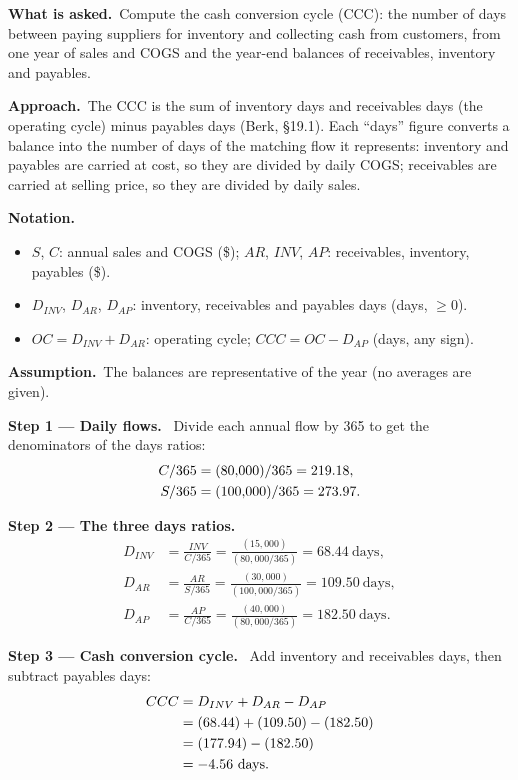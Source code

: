 \documentclass[11pt,a4paper]{article}
\newcommand{\notation}{\par\noindent\textbf{Notation.}}
\newcommand{\step}[2]{\par\medskip\noindent\textbf{Step #1 --- #2.}~}
\newcommand{\assume}{\par\smallskip\noindent\textbf{Assumption.}~}
\newcommand{\asked}{\par\medskip\noindent\textbf{What is asked.}~}
\newcommand{\approach}{\par\smallskip\noindent\textbf{Approach.}~}
\begin{document}
\asked Compute the cash conversion cycle (CCC): the number of days between paying suppliers for
inventory and collecting cash from customers, from one year of sales and COGS and the year-end
balances of receivables, inventory and payables.

\approach The CCC is the sum of inventory days and receivables days (the operating cycle) minus
payables days (Berk, \S19.1). Each ``days'' figure converts a balance into the number of days of
the matching flow it represents: inventory and payables are carried at cost, so they are divided
by daily COGS; receivables are carried at selling price, so they are divided by daily sales.

\notation
\begin{itemize}
  \item $S$, $C$: annual sales and COGS (\$); $AR$, $INV$, $AP$: receivables, inventory, payables (\$).
  \item $D_{INV}$, $D_{AR}$, $D_{AP}$: inventory, receivables and payables days (days, $\ge 0$).
  \item $OC = D_{INV}+D_{AR}$: operating cycle; $CCC = OC - D_{AP}$ (days, any sign).
\end{itemize}
\assume The balances are representative of the year (no averages are given).

\step{1}{Daily flows}
Divide each annual flow by 365 to get the denominators of the days ratios:
\begin{align}
  C/365 &= (80{,}000)/365 = 219.18, \notag\\
  S/365 &= (100{,}000)/365 = 273.97. \notag
\end{align}

\step{2}{The three days ratios}
\begin{align}
  D_{INV} &= \frac{INV}{C/365} = \frac{(15{,}000)}{(80{,}000/365)} = 68.44 \ \text{days}, \label{r5be1-inv}\\
  D_{AR} &= \frac{AR}{S/365} = \frac{(30{,}000)}{(100{,}000/365)} = 109.50 \ \text{days}, \label{r5be1-ar}\\
  D_{AP} &= \frac{AP}{C/365} = \frac{(40{,}000)}{(80{,}000/365)} = 182.50 \ \text{days}. \label{r5be1-ap}
\end{align}

\step{3}{Cash conversion cycle}
Add inventory and receivables days, then subtract payables days:
\begin{align}
  CCC &= D_{INV} + D_{AR} - D_{AP} \label{r5be1-ccc}\\
  &= (68.44) + (109.50) - (182.50) \notag\\
  &= (177.94) - (182.50) \notag\\
  &= -4.56 \ \text{days}. \notag
\end{align}
\end{document}
